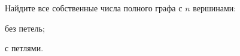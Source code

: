 Найдите все собственные числа полного графа с $n$ вершинами:
\begin{enumcyr}
    \item без петель;
    \item с петлями.
\end{enumcyr}